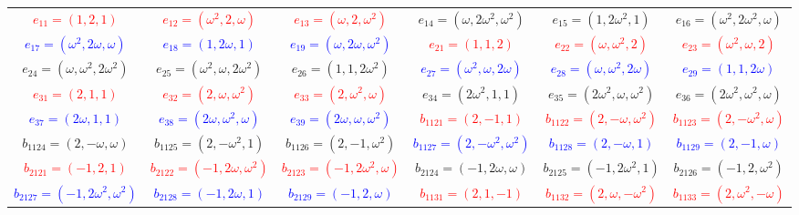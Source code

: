 \documentclass[%
  reprint,
  superscriptaddress,
  showpacs,
  showkeys,
  amsmath,amssymb,
  pra,
  longbibliography,
  floatfix,
  x11names
]{revtex4-2}
\begin{document}
\begin{table}[htbp!]
\begin{ruledtabular}
\begin{tabular}{*{6}{c}}
\textcolor{red}{$e_{11}=(1,2,1)$} & \textcolor{red}{$e_{12}=(\omega^2,2,\omega)$} & \textcolor{red}{$e_{13}=(\omega,2,\omega^2)$} & \textcolor{green!40!black}{$e_{14}=(\omega,2\omega^2,\omega^2)$} & \textcolor{green!40!black}{$e_{15}=(1,2\omega^2,1)$} & \textcolor{green!40!black}{$e_{16}=(\omega^2,2\omega^2,\omega)$} \\
\textcolor{blue}{$e_{17}=(\omega^2,2\omega,\omega)$} & \textcolor{blue}{$e_{18}=(1,2\omega,1)$} & \textcolor{blue}{$e_{19}=(\omega,2\omega,\omega^2)$} & \textcolor{red}{$e_{21}=(1,1,2)$} & \textcolor{red}{$e_{22}=(\omega,\omega^2,2)$} & \textcolor{red}{$e_{23}=(\omega^2,\omega,2)$} \\
\textcolor{green!40!black}{$e_{24}=(\omega,\omega^2,2\omega^2)$} & \textcolor{green!40!black}{$e_{25}=(\omega^2,\omega,2\omega^2)$} & \textcolor{green!40!black}{$e_{26}=(1,1,2\omega^2)$} & \textcolor{blue}{$e_{27}=(\omega^2,\omega,2\omega)$} & \textcolor{blue}{$e_{28}=(\omega,\omega^2,2\omega)$} & \textcolor{blue}{$e_{29}=(1,1,2\omega)$} \\
\textcolor{red}{$e_{31}=(2,1,1)$} & \textcolor{red}{$e_{32}=(2,\omega,\omega^2)$} & \textcolor{red}{$e_{33}=(2,\omega^2,\omega)$} & \textcolor{green!40!black}{$e_{34}=(2\omega^2,1,1)$} & \textcolor{green!40!black}{$e_{35}=(2\omega^2,\omega,\omega^2)$} & \textcolor{green!40!black}{$e_{36}=(2\omega^2,\omega^2,\omega)$} \\
\textcolor{blue}{$e_{37}=(2\omega,1,1)$} & \textcolor{blue}{$e_{38}=(2\omega,\omega^2,\omega)$} & \textcolor{blue}{$e_{39}=(2\omega,\omega,\omega^2)$} & \textcolor{red}{$b_{1121}=(2,-1,1)$} & \textcolor{red}{$b_{1122}=(2,-\omega,\omega^2)$} & \textcolor{red}{$b_{1123}=(2,-\omega^2,\omega)$} \\
\textcolor{green!40!black}{$b_{1124}=(2,-\omega,\omega)$} & \textcolor{green!40!black}{$b_{1125}=(2,-\omega^2,1)$} & \textcolor{green!40!black}{$b_{1126}=(2,-1,\omega^2)$} & \textcolor{blue}{$b_{1127}=(2,-\omega^2,\omega^2)$} & \textcolor{blue}{$b_{1128}=(2,-\omega,1)$} & \textcolor{blue}{$b_{1129}=(2,-1,\omega)$} \\
\textcolor{red}{$b_{2121}=(-1,2,1)$} & \textcolor{red}{$b_{2122}=(-1,2\omega,\omega^2)$} & \textcolor{red}{$b_{2123}=(-1,2\omega^2,\omega)$} & \textcolor{green!40!black}{$b_{2124}=(-1,2\omega,\omega)$} & \textcolor{green!40!black}{$b_{2125}=(-1,2\omega^2,1)$} & \textcolor{green!40!black}{$b_{2126}=(-1,2,\omega^2)$} \\
\textcolor{blue}{$b_{2127}=(-1,2\omega^2,\omega^2)$} & \textcolor{blue}{$b_{2128}=(-1,2\omega,1)$} & \textcolor{blue}{$b_{2129}=(-1,2,\omega)$} & \textcolor{red}{$b_{1131}=(2,1,-1)$} & \textcolor{red}{$b_{1132}=(2,\omega,-\omega^2)$} & \textcolor{red}{$b_{1133}=(2,\omega^2,-\omega)$} \\

\end{tabular}
\end{ruledtabular}
\end{table}
\end{document}
